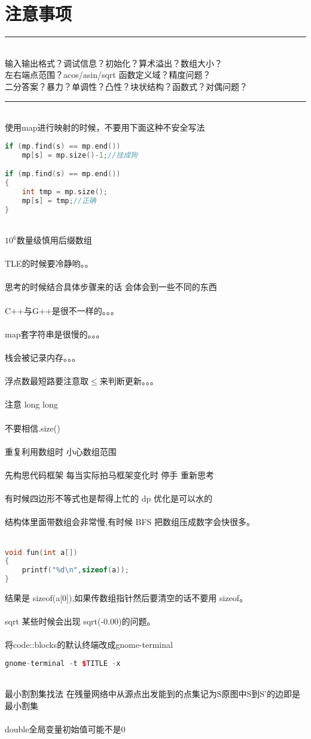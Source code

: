 \section{注意事项}
	\hrule\ 
	\\
	输入输出格式？调试信息？初始化？算术溢出？数组大小？
	\\
	左右端点范围？acos/asin/sqrt 函数定义域？精度问题？
	\\
	二分答案？暴力？单调性？凸性？块状结构？函数式？对偶问题？
	\\
	\hrule\
	\\
	使用map进行映射的时候，不要用下面这种不安全写法
	\begin{lstlisting}[language=c++]
if (mp.find(s) == mp.end())
	mp[s] = mp.size()-1;//挂成狗

if (mp.find(s) == mp.end())
{
	int tmp = mp.size();
	mp[s] = tmp;//正确
}
	\end{lstlisting}
	~\\
	$10^{6}$数量级慎用后缀数组\\
	\\
	TLE的时候要冷静哟。。\\
	\\
	思考的时候结合具体步骤来的话 会体会到一些不同的东西\\
	\\
	C++与G++是很不一样的。。。\\
	\\
	map套字符串是很慢的。。。\\ 
	\\
	栈会被记录内存。。。\\
	\\
	浮点数最短路要注意取$\leq$来判断更新。。。\\
	\\
	注意 long long\\
	\\
	不要相信.size()\\
	\\
	重复利用数组时 小心数组范围\\
	\\
	先构思代码框架 每当实际拍马框架变化时 停手 重新思考\\
	\\
	有时候四边形不等式也是帮得上忙的 dp 优化是可以水的\\
	\\
	结构体里面带数组会非常慢,有时候 BFS 把数组压成数字会快很多。\\
	\\
	\begin{lstlisting}[language=c++]
void fun(int a[])
{
	printf("%d\n",sizeof(a));
}
	\end{lstlisting}
	结果是 sizeof(a[0]),如果传数组指针然后要清空的话不要用 sizeof。\\
	\\
	sqrt 某些时候会出现 sqrt(-0.00)的问题。\\
	\\
	将code::blocks的默认终端改成gnome-terminal
	\begin{lstlisting}[language=c++]
gnome-terminal -t $TITLE -x
	\end{lstlisting}
	~\\
	最小割割集找法 在残量网络中从源点出发能到的点集记为S原图中S到S’的边即是最小割集\\
	\\
	double全局变量初始值可能不是$0$\\